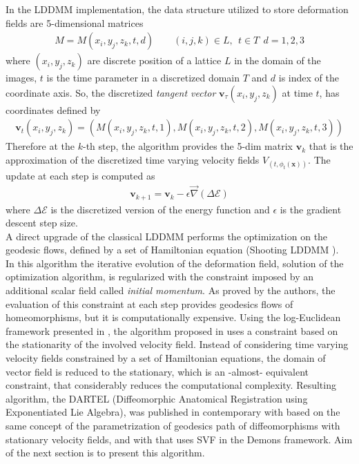 In the LDDMM implementation, the data structure utilized to store deformation fields are 5-dimensional matrices
\begin{align}\label{eq:basic_data_structure}
M = M(x_i,y_j,z_k,t,d) \qquad (i,j,k)\in L , ~~ t \in T  ~~ d = 1,2,3
\end{align}
where $(x_i,y_j,z_k)$ are discrete position of a lattice $L$ in the domain of the images, $t$ is the time parameter in a discretized domain $T$ and $d$ is index of the coordinate axis. So, the discretized \emph{tangent vector} $\mathbf{v}_{\tau}(x_i,y_j,z_k)$ at time $t$, has coordinates defined by
\begin{align*}
\mathbf{v}_{t}(x_i,y_j,z_k) = (M(x_i,y_j,z_k,t ,1), M(x_i,y_j,z_k,t,2), M(x_i,y_j,z_k,t ,3))
\end{align*}
Therefore at the $k$-th step, the algorithm provides the 5-dim matrix $\mathbf{v}_{k}$ that is the approximation of the discretized time varying velocity fields $V_{(t,\phi_{t} (\mathbf{x}))}$. The update at each step is computed as
\begin{align*}
\mathbf{v}_{k+1} = \mathbf{v}_{k} - \epsilon \vec{\nabla} (\Delta\mathcal{E})
\end{align*}
where $\Delta\mathcal{E}$ is the discretized version of the energy function and $\epsilon$ is the gradient descent step size.\\

A direct upgrade of the classical LDDMM performs the optimization on the geodesic flows, defined by a set of Hamiltonian equation (Shooting LDDMM \cite{vialard2012diffeomorphic}). \\
In this algorithm the iterative evolution of the deformation field, solution of the optimization algorithm, is regularized with the constraint imposed by an additional scalar field called \emph{initial momentum}. 
As proved by the authors, the evaluation of this constraint at each step provides geodesics flows of homeomorphisms, but it is computationally expensive. Using the log-Euclidean framework presented in \cite{Arsigny:MRM:06}, the algorithm proposed in \cite{Ashburner:07} uses a constraint based on the stationarity of the involved velocity field. Instead of considering time varying velocity fields constrained by a set of Hamiltonian equations, the domain of vector field is reduced to the stationary, which is an -almost- equivalent constraint, that considerably reduces the computational complexity. Resulting algorithm, the DARTEL (Diffeomorphic Anatomical Registration using Exponentiated Lie Algebra), was published in contemporary with \cite{hernandez2007registration} based on the same concept of the parametrization of geodesics path of diffeomorphisms with stationary velocity fields, and with \cite{vercauteren2007non} that uses SVF in the Demons framework. Aim of the next section is to present this algorithm.



